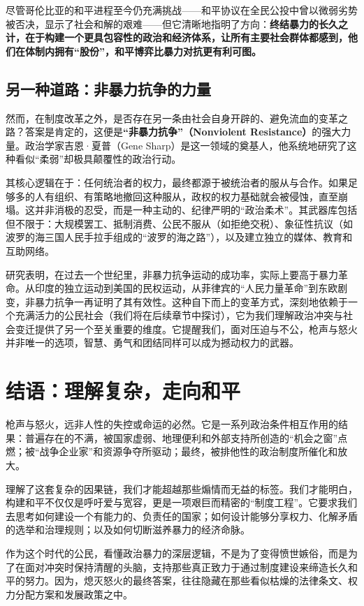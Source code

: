 \documentclass[a5paper, 11pt, openany]{ctexbook}
\begin{document}
尽管哥伦比亚的和平进程至今仍充满挑战——和平协议在全民公投中曾以微弱劣势被否决，显示了社会和解的艰难——但它清晰地指明了方向：\textbf{终结暴力的长久之计，在于构建一个更具包容性的政治和经济体系，让所有主要社会群体都感到，他们在体制内拥有“股份”，和平博弈比暴力对抗更有利可图。}

\subsection{另一种道路：非暴力抗争的力量}

然而，在制度改革之外，是否存在另一条由社会自身开辟的、避免流血的变革之路？答案是肯定的，这便是\textbf{“非暴力抗争”（Nonviolent Resistance）}的强大力量。政治学家吉恩·夏普（Gene Sharp）是这一领域的奠基人，他系统地研究了这种看似“柔弱”却极具颠覆性的政治行动。

其核心逻辑在于：任何统治者的权力，最终都源于被统治者的服从与合作。如果足够多的人有组织、有策略地撤回这种服从，政权的权力基础就会被侵蚀，直至崩塌。这并非消极的忍受，而是一种主动的、纪律严明的“政治柔术”。其武器库包括但不限于：大规模罢工、抵制消费、公民不服从（如拒绝交税）、象征性抗议（如波罗的海三国人民手拉手组成的“波罗的海之路”），以及建立独立的媒体、教育和互助网络。

研究表明，在过去一个世纪里，非暴力抗争运动的成功率，实际上要高于暴力革命。从印度的独立运动到美国的民权运动，从菲律宾的“人民力量革命”到东欧剧变，非暴力抗争一再证明了其有效性。这种自下而上的变革方式，深刻地依赖于一个充满活力的公民社会（我们将在后续章节中探讨），它为我们理解政治冲突与社会变迁提供了另一个至关重要的维度。它提醒我们，面对压迫与不公，枪声与怒火并非唯一的选项，智慧、勇气和团结同样可以成为撼动权力的武器。

\section*{结语：理解复杂，走向和平}

枪声与怒火，远非人性的失控或命运的必然。它是一系列政治条件相互作用的结果：普遍存在的不满，被国家虚弱、地理便利和外部支持所创造的“机会之窗”点燃；被“战争企业家”和资源争夺所驱动；最终，被排他性的政治制度所催化和放大。

理解了这套复杂的因果链，我们才能超越那些煽情而无益的标签。我们才能明白，构建和平不仅仅是呼吁爱与宽容，更是一项艰巨而精密的“制度工程”。它要求我们去思考如何建设一个有能力的、负责任的国家；如何设计能够分享权力、化解矛盾的选举和治理规则；以及如何切断滋养暴力的经济命脉。

作为这个时代的公民，看懂政治暴力的深层逻辑，不是为了变得愤世嫉俗，而是为了在面对冲突时保持清醒的头脑，支持那些真正致力于通过制度建设来缔造长久和平的努力。因为，熄灭怒火的最终答案，往往隐藏在那些看似枯燥的法律条文、权力分配方案和发展政策之中。
\end{document}
